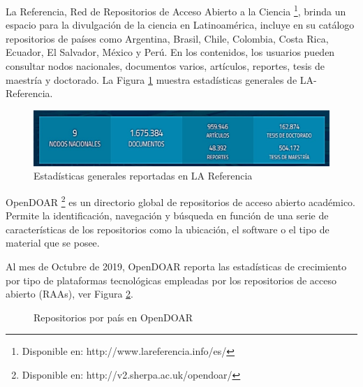 La Referencia, Red de Repositorios de Acceso Abierto a la Ciencia \cite{LaReferencia} \footnote{Disponible en: http://www.lareferencia.info/es/}, brinda un espacio para la divulgaci\'on de la ciencia en Latinoam\'erica, incluye en su cat\'alogo repositorios de pa\'ises como Argentina, Brasil, Chile, Colombia, Costa Rica, Ecuador, El Salvador, M\'exico y Per\'u. En los contenidos, los usuarios pueden consultar nodos nacionales, documentos varios, art\'iculos, reportes, tesis de maestr\'ia y doctorado. La Figura \ref{laReferencia} muestra estad\'isticas generales de LA-Referencia. 

\begin{figure}[!ht]
    \centering
    \includegraphics[width=14cm]{figures/lareferencia1.jpg} %
    \caption{Estad\'isticas generales reportadas en LA Referencia} %
    \label{laReferencia}
\end{figure}

OpenDOAR \footnote{Disponible en: http://v2.sherpa.ac.uk/opendoar/} es un directorio global de repositorios de acceso abierto acad\'emico. Permite la identificaci\'on, navegaci\'on y b\'usqueda en funci\'on de una serie de caracter\'isticas de los repositorios como la ubicaci\'on, el software o el tipo de material que se posee. \newline

Al mes de Octubre de 2019, OpenDOAR reporta las estad\'isticas de crecimiento por tipo de plataformas tecnol\'ogicas empleadas por los repositorios de acceso abierto (RAAs), ver Figura \ref{opendoarEstadisticas1}.

\begin{figure}[!ht]
    \centering
    \caption{Repositorios por pa\'is en OpenDOAR} %
    \label{opendoarEstadisticas1}
\end{figure}

